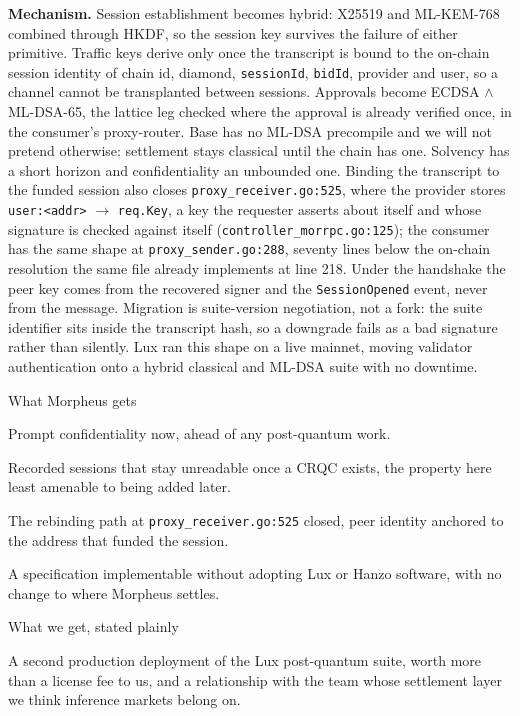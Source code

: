 \documentclass[10pt,a4paper]{article}
\newcommand{\code}[1]{\texttt{\small #1}}
\begin{document}
\vspace{0.35ex}
\noindent\textbf{Mechanism.}
Session establishment becomes hybrid: X25519 and ML-KEM-768 combined through
HKDF, so the session key survives the failure of either primitive. Traffic keys
derive only once the transcript is bound to the on-chain session identity of
chain id, diamond, \code{sessionId}, \code{bidId}, provider and user, so a
channel cannot be transplanted between sessions. Approvals become ECDSA $\wedge$
ML-DSA-65, the lattice leg checked where the approval is already verified once,
in the consumer's proxy-router. Base has no ML-DSA precompile and we will not
pretend otherwise: settlement stays classical until the chain has one. Solvency
has a short horizon and confidentiality an unbounded one. Binding the transcript to the funded session also closes
\code{proxy\_receiver.go:525}, where the provider stores \code{user:<addr>}
$\rightarrow$ \code{req.Key}, a key the requester asserts about itself and whose
signature is checked against itself (\code{controller\_morrpc.go:125}); the
consumer has the same shape at \code{proxy\_sender.go:288}, seventy lines below
the on-chain resolution the same file already implements at line 218. Under the
handshake the peer key comes from the recovered signer and the
\code{SessionOpened} event, never from the message. Migration is suite-version
negotiation, not a fork: the suite identifier sits inside the transcript hash,
so a downgrade fails as a bad signature rather than silently. Lux ran this shape
on a live mainnet, moving validator authentication onto a hybrid classical and
ML-DSA suite with no downtime.

\begin{stake}{What Morpheus gets}
  \item Prompt confidentiality now, ahead of any post-quantum work.
  \item Recorded sessions that stay unreadable once a CRQC exists, the property
        here least amenable to being added later.
  \item The rebinding path at \code{proxy\_receiver.go:525} closed, peer identity
        anchored to the address that funded the session.
  \item A specification implementable without adopting Lux or Hanzo software,
        with no change to where Morpheus settles.
\end{stake}

\begin{stake}{What we get, stated plainly}
  \item A second production deployment of the Lux post-quantum suite, worth more
        than a license fee to us, and a relationship with the team whose
        settlement layer we think inference markets belong on.
\end{stake}
\end{document}
